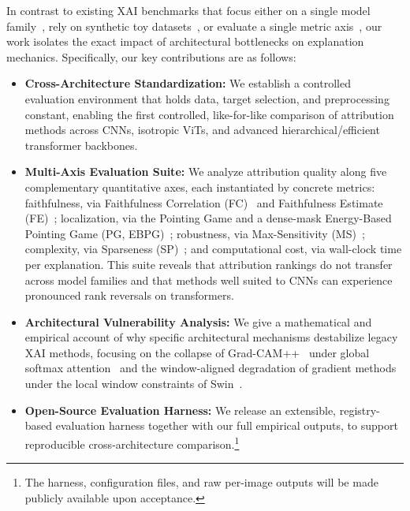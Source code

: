 \documentclass[final,5p,times,twocolumn]{elsarticle}
\begin{document}
In contrast to existing XAI benchmarks that focus either on a single model family~\cite{wu2024faithfulness}, rely on synthetic toy datasets~\cite{hesse2023funnybirds,arras2022clevrxai}, or evaluate a single metric axis~\cite{hooker2019roar,rao2022attribution}, our work isolates the exact impact of architectural bottlenecks on explanation mechanics. Specifically, our key contributions are as follows:
\begin{itemize}[leftmargin=*]
    \item \textbf{Cross-Architecture Standardization:} We establish a controlled evaluation environment that holds data, target selection, and preprocessing constant, enabling the first controlled, like-for-like comparison of attribution methods across CNNs, isotropic ViTs, and advanced hierarchical/efficient transformer backbones.
    \item \textbf{Multi-Axis Evaluation Suite:} We analyze attribution quality along five complementary quantitative axes, each instantiated by concrete metrics: faithfulness, via Faithfulness Correlation (FC)~\cite{bhatt2020faithfulness} and Faithfulness Estimate (FE)~\cite{alvarez2018robustness}; localization, via the Pointing Game and a dense-mask Energy-Based Pointing Game (PG, EBPG)~\cite{zhang2018pointing}; robustness, via Max-Sensitivity (MS)~\cite{yeh2019sensitivity}; complexity, via Sparseness (SP)~\cite{chalasani2020sparseness}; and computational cost, via wall-clock time per explanation. This suite reveals that attribution rankings do not transfer across model families and that methods well suited to CNNs can experience pronounced rank reversals on transformers.
    \item \textbf{Architectural Vulnerability Analysis:} We give a mathematical and empirical account of why specific architectural mechanisms destabilize legacy XAI methods, focusing on the collapse of Grad-CAM++~\cite{chattopadhay2018gradcampp} under global softmax attention~\cite{dosovitskiy2021vit} and the window-aligned degradation of gradient methods under the local window constraints of Swin~\cite{liu2021swin}.
    \item \textbf{Open-Source Evaluation Harness:} We release an extensible, registry-based evaluation harness together with our full empirical outputs, to support reproducible cross-architecture comparison.\footnote{The harness, configuration files, and raw per-image outputs will be made publicly available upon acceptance.}
\end{itemize}
\end{document}
